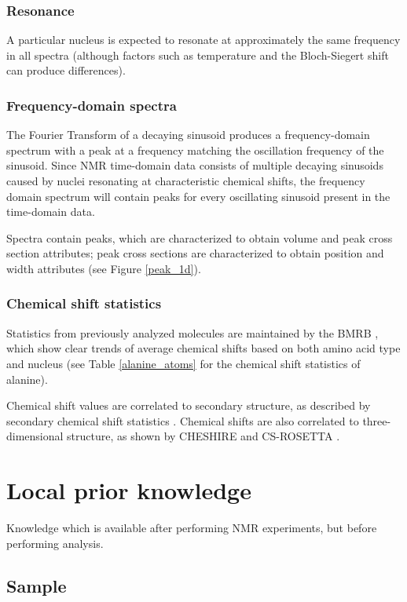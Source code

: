 \subsubsection{Resonance}
A particular nucleus is expected to resonate at approximately the same 
frequency in all spectra (although factors such as temperature and the 
Bloch-Siegert shift can produce differences).

\subsubsection{Frequency-domain spectra}
The Fourier Transform of a decaying sinusoid produces a frequency-domain 
spectrum with a peak at a frequency matching the oscillation frequency of 
the sinusoid.  Since NMR time-domain data consists of multiple decaying 
sinusoids caused by nuclei resonating at characteristic chemical shifts, 
the frequency domain spectrum will contain peaks for every oscillating 
sinusoid present in the time-domain data.  

Spectra contain peaks, which are characterized to obtain volume and peak
cross section attributes; peak cross sections are characterized to obtain 
position and width attributes (see Figure \ref{peak_1d}).

\subsubsection{Chemical shift statistics}
Statistics from previously analyzed molecules are maintained by the BMRB
\cite{bmrb}, which show clear trends of average chemical shifts based on
both amino acid type and nucleus (see Table \ref{alanine_atoms} for the 
chemical shift statistics of alanine).

Chemical shift values are correlated to secondary structure, as described
by secondary chemical shift statistics \cite{spera1991empirical}.  Chemical 
shifts are also correlated to three-dimensional structure, as shown by 
CHESHIRE \cite{cheshire} and CS-ROSETTA \cite{cs-rosetta}.  


\section{Local prior knowledge}
Knowledge which is available after performing NMR experiments, but before
performing analysis.

\subsection*{Sample}

